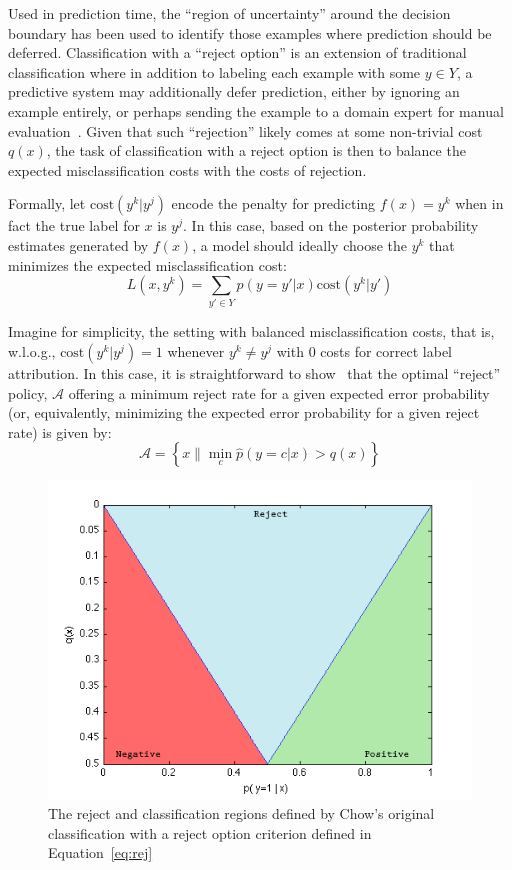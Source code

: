 Used in prediction time, the ``region of uncertainty'' around the decision boundary has been used to identify those examples where prediction should be deferred. Classification with a ``reject option'' is an extension of traditional classification where in addition to labeling each example with some $y \in Y$, a predictive system may additionally defer prediction, either by ignoring an example entirely, or perhaps sending the example to a domain expert for manual evaluation~\cite{chow:57,chow:70}. Given that such ``rejection'' likely comes at some non-trivial cost $q(x)$, the task of classification with a reject option is then to balance the expected misclassification costs with the costs of rejection.

Formally, let $\mbox{cost}(y^k | y^j)$ encode the penalty for predicting $f(x) = y^k$ when in fact the true label for $x$ is $y^j$. In this case, based on the posterior probability estimates generated by $f(x)$, a model should ideally choose the $y^k$ that minimizes the expected misclassification cost: $$L(x, y^k) = \sum_{y' \in Y} p(y = y' | x) \mbox{cost}(y^k | y')$$

Imagine for simplicity, the setting with balanced misclassification costs, that is, w.l.o.g., $\mbox{cost}(y^k | y^j) = 1$ whenever $y^k \neq y^j$ with $0$ costs for correct label attribution.  In this case, it is straightforward to show~\cite{chow:57,chow:70} that the optimal ``reject'' policy, $\mathcal{A}$ offering a minimum reject rate for a given expected error probability (or, equivalently, minimizing the expected error probability for a given reject rate) is given by:
\vspace{-0.03in}
\begin{equation}
\mathcal{A} = \left\{ x \| \min_c \hat{p}(y = c | x) > q(x) \right\}
\label{eq:rej}
\end{equation}

\begin{figure}[hbt]
\begin{center}
\includegraphics[width= .95 \columnwidth]{plots/reject_decision_bounds_fill.png}
\end{center}
\caption{The reject and classification regions defined by Chow's original classification with a reject option criterion defined in Equation~\ref{eq:rej}}
\label{fig:rejectdecision}
\end{figure}

